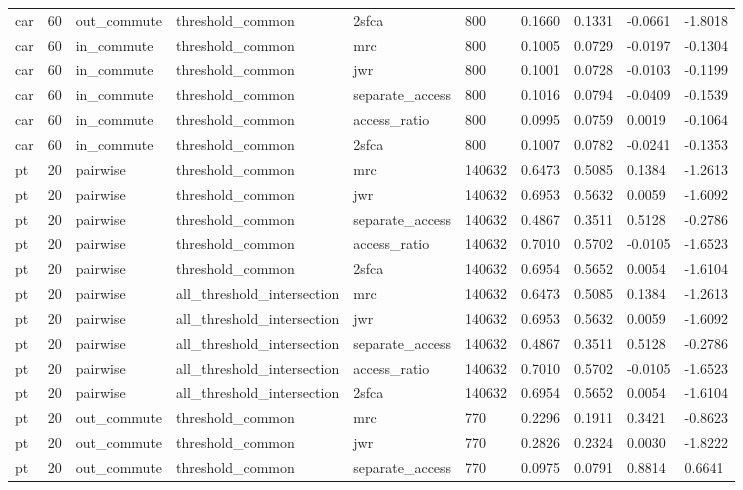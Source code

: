 \begin{table}[htbp]
\begin{tabular}{llllllllll}
car & 60 & out\_commute & threshold\_common & 2sfca & 800 & 0.1660 & 0.1331 & -0.0661 & -1.8018 \\
car & 60 & in\_commute & threshold\_common & mrc & 800 & 0.1005 & 0.0729 & -0.0197 & -0.1304 \\
car & 60 & in\_commute & threshold\_common & jwr & 800 & 0.1001 & 0.0728 & -0.0103 & -0.1199 \\
car & 60 & in\_commute & threshold\_common & separate\_access & 800 & 0.1016 & 0.0794 & -0.0409 & -0.1539 \\
car & 60 & in\_commute & threshold\_common & access\_ratio & 800 & 0.0995 & 0.0759 & 0.0019 & -0.1064 \\
car & 60 & in\_commute & threshold\_common & 2sfca & 800 & 0.1007 & 0.0782 & -0.0241 & -0.1353 \\
pt & 20 & pairwise & threshold\_common & mrc & 140632 & 0.6473 & 0.5085 & 0.1384 & -1.2613 \\
pt & 20 & pairwise & threshold\_common & jwr & 140632 & 0.6953 & 0.5632 & 0.0059 & -1.6092 \\
pt & 20 & pairwise & threshold\_common & separate\_access & 140632 & 0.4867 & 0.3511 & 0.5128 & -0.2786 \\
pt & 20 & pairwise & threshold\_common & access\_ratio & 140632 & 0.7010 & 0.5702 & -0.0105 & -1.6523 \\
pt & 20 & pairwise & threshold\_common & 2sfca & 140632 & 0.6954 & 0.5652 & 0.0054 & -1.6104 \\
pt & 20 & pairwise & all\_threshold\_intersection & mrc & 140632 & 0.6473 & 0.5085 & 0.1384 & -1.2613 \\
pt & 20 & pairwise & all\_threshold\_intersection & jwr & 140632 & 0.6953 & 0.5632 & 0.0059 & -1.6092 \\
pt & 20 & pairwise & all\_threshold\_intersection & separate\_access & 140632 & 0.4867 & 0.3511 & 0.5128 & -0.2786 \\
pt & 20 & pairwise & all\_threshold\_intersection & access\_ratio & 140632 & 0.7010 & 0.5702 & -0.0105 & -1.6523 \\
pt & 20 & pairwise & all\_threshold\_intersection & 2sfca & 140632 & 0.6954 & 0.5652 & 0.0054 & -1.6104 \\
pt & 20 & out\_commute & threshold\_common & mrc & 770 & 0.2296 & 0.1911 & 0.3421 & -0.8623 \\
pt & 20 & out\_commute & threshold\_common & jwr & 770 & 0.2826 & 0.2324 & 0.0030 & -1.8222 \\
pt & 20 & out\_commute & threshold\_common & separate\_access & 770 & 0.0975 & 0.0791 & 0.8814 & 0.6641 \\

\end{tabular}
\end{table}
